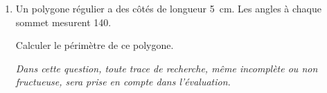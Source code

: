 \begin{enumerate}
\begin{enumerate}
\medskip

	\end{enumerate}
\item Un polygone régulier a des côtés de longueur 5~cm. Les angles à chaque sommet mesurent 140\degres.
	
Calculer le périmètre de ce polygone.
	
\emph{Dans cette question, toute trace de recherche, même incomplète ou non fructueuse, sera prise en compte dans l'évaluation.}
\end{enumerate}

\vspace{0,5cm}


